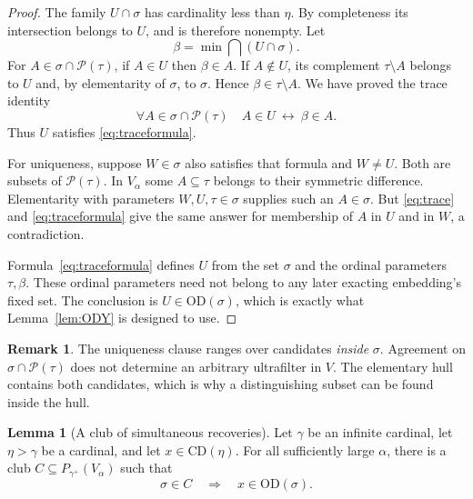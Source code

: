 \documentclass[11pt,letterpaper]{article}
\theoremstyle{definition}
\newtheorem{lemma}[definition]{Lemma}
\newcommand{\OD}{\mathrm{OD}}
\newcommand{\CD}{\mathrm{CD}}
\newcommand{\Pow}{\mathcal P}
\newtheorem{remark}[definition]{Remark}
\numberwithin{equation}{section}
\begin{document}
\begin{proof}
The family $U\cap\sigma$ has cardinality less than $\eta$. By completeness its intersection belongs to $U$, and is therefore nonempty. Let
\begin{equation}\label{eq:beta}
 \beta=\min\bigcap(U\cap\sigma).
\end{equation}
For $A\in\sigma\cap\Pow(\tau)$, if $A\in U$ then $\beta\in A$. If $A\notin U$, its complement $\tau\setminus A$ belongs to $U$ and, by elementarity of $\sigma$, to $\sigma$. Hence $\beta\in\tau\setminus A$. We have proved the trace identity
\begin{equation}\label{eq:trace}
 \forall A\in\sigma\cap\Pow(\tau)\quad
       A\in U\ \longleftrightarrow\ \beta\in A.
\end{equation}
Thus $U$ satisfies \eqref{eq:traceformula}.

For uniqueness, suppose $W\in\sigma$ also satisfies that formula and $W\ne U$. Both are subsets of $\Pow(\tau)$. In $V_\alpha$ some $A\subseteq\tau$ belongs to their symmetric difference. Elementarity with parameters $W,U,\tau\in\sigma$ supplies such an $A\in\sigma$. But \eqref{eq:trace} and \eqref{eq:traceformula} give the same answer for membership of $A$ in $U$ and in $W$, a contradiction.

Formula~\eqref{eq:traceformula} defines $U$ from the set $\sigma$ and the ordinal parameters $\tau,\beta$. These ordinal parameters need not belong to any later exacting embedding's fixed set. The conclusion is $U\in\OD(\sigma)$, which is exactly what Lemma~\ref{lem:ODY} is designed to use.
\end{proof}

\begin{remark}
The uniqueness clause ranges over candidates \emph{inside} $\sigma$. Agreement on $\sigma\cap\Pow(\tau)$ does not determine an arbitrary ultrafilter in $V$. The elementary hull contains both candidates, which is why a distinguishing subset can be found inside the hull.
\end{remark}

\begin{lemma}[A club of simultaneous recoveries]\label{lem:club}
Let $\gamma$ be an infinite cardinal, let $\eta>\gamma$ be a cardinal, and let $x\in\CD(\eta)$. For all sufficiently large $\alpha$, there is a club $C\subseteq P_{\gamma^+}(V_\alpha)$ such that
\begin{equation}\label{eq:clubOD}
 \sigma\in C\quad\Longrightarrow\quad x\in\OD(\sigma).
\end{equation}
\end{lemma}
\end{document}
